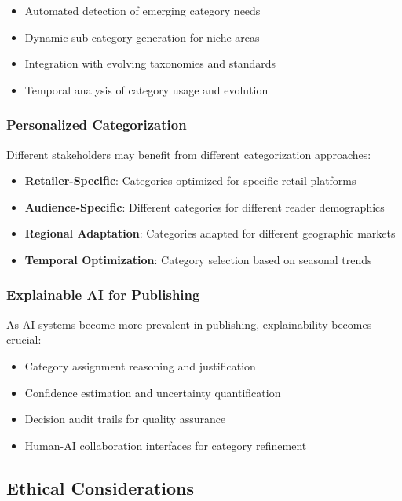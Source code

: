 \documentclass{article}
\begin{document}
\begin{itemize}
\item Automated detection of emerging category needs
\item Dynamic sub-category generation for niche areas
\item Integration with evolving taxonomies and standards
\item Temporal analysis of category usage and evolution
\end{itemize}

\subsubsection{Personalized Categorization}

Different stakeholders may benefit from different categorization approaches:

\begin{itemize}
\item \textbf{Retailer-Specific}: Categories optimized for specific retail platforms
\item \textbf{Audience-Specific}: Different categories for different reader demographics
\item \textbf{Regional Adaptation}: Categories adapted for different geographic markets
\item \textbf{Temporal Optimization}: Category selection based on seasonal trends
\end{itemize}

\subsubsection{Explainable AI for Publishing}

As AI systems become more prevalent in publishing, explainability becomes crucial:

\begin{itemize}
\item Category assignment reasoning and justification
\item Confidence estimation and uncertainty quantification
\item Decision audit trails for quality assurance
\item Human-AI collaboration interfaces for category refinement
\end{itemize}

\subsection{Ethical Considerations}
\end{document}
